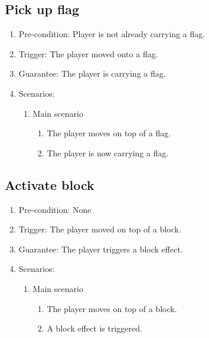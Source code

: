 \documentclass[a4paper,twoside,11pt]{article}
\begin{document}
\subsection*{Pick up flag}
\begin{enumerate}
\item Pre-condition: Player is not already carrying a flag.
\item Trigger: The player moved onto a flag.
\item Guarantee: The player is carrying a flag.
\item Scenarios: 
	\begin{enumerate}
	\item Main scenario
		\begin{enumerate}[1)]
		\item The player moves on top of a flag.
		\item The player is now carrying a flag.
		\end{enumerate}
	\end{enumerate}
\end{enumerate}
\subsection*{Activate block}
\begin{enumerate}
\item Pre-condition: None
\item Trigger: The player moved on top of a block.
\item Guarantee: The player triggers a block effect.
\item Scenarios: 
	\begin{enumerate}
	\item Main scenario
		\begin{enumerate}[1)]
		\item The player moves on top of a block.
		\item A block effect is triggered.
		\end{enumerate}
	\end{enumerate}
\end{enumerate}
\end{document}

